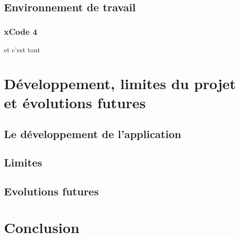 \documentclass[11pt, french]{report}
\begin{document}
\section{Environnement de travail}

\subsection{xCode 4}

et c’est tout





\chapter{Développement, limites du projet et évolutions futures}

\section{Le développement de l’application}







\section{Limites}







\section{Evolutions futures}





\chapter*{Conclusion}



 
\end{document}
